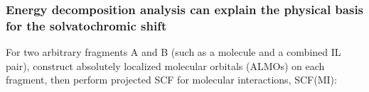 \documentclass[%
    xcolor=usenames,dvipsnames,svgnames%
]{beamer}
\begin{document}
\begin{frame}
  \frametitle{Energy decomposition analysis can explain the physical basis for the solvatochromic shift}
  For two arbitrary fragments A and B (such as a  molecule and a combined IL pair), construct \alert{absolutely localized molecular orbitals} (ALMOs) on each fragment, then perform projected SCF for molecular interactions, SCF(MI):
  \begin{table}
    \centering
    \begin{tabular}{ccc}

\end{tabular}
\end{table}
\end{frame}
\end{document}
